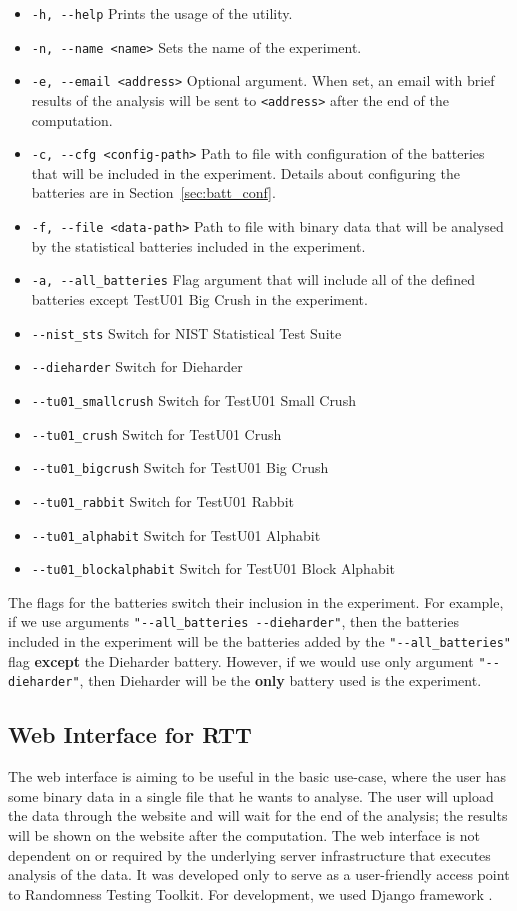 \documentclass[
	digital,    %
	oneside,    %
	color,
	11pt,
	nocover,
	notable,
	nolof,
	nolot,
]{fithesis3}
\theoremstyle{definition}
\theoremstyle{remark}
\begin{document}
\begin{itemize}
\item \texttt{-h, -{}-help} Prints the usage of the utility.
\item \texttt{-n, -{}-name <name>} Sets the name of the experiment.
\item \texttt{-e, -{}-email <address>} Optional argument. When set, an email with brief results of the analysis will be sent to \texttt{<address>} after the end of the computation.
\item \texttt{-c, -{}-cfg <config-path>} Path to file with configuration of the batteries that will be included in the experiment. Details about configuring the batteries are in Section~\ref{sec:batt_conf}.
\item \texttt{-f, -{}-file <data-path>} Path to file with binary data that will be analysed by the statistical batteries included in the experiment.
\item \texttt{-a, -{}-all\_batteries} Flag argument that will include all of the defined batteries except TestU01 Big Crush in the experiment.
\item \texttt{-{}-nist\_sts} Switch for NIST Statistical Test Suite
\item \texttt{-{}-dieharder} Switch for Dieharder 
\item \texttt{-{}-tu01\_smallcrush} Switch for TestU01 Small Crush
\item \texttt{-{}-tu01\_crush} Switch for TestU01 Crush
\item \texttt{-{}-tu01\_bigcrush} Switch for TestU01 Big Crush
\item \texttt{-{}-tu01\_rabbit} Switch for TestU01 Rabbit
\item \texttt{-{}-tu01\_alphabit} Switch for TestU01 Alphabit
\item \texttt{-{}-tu01\_blockalphabit} Switch for TestU01 Block Alphabit
\end{itemize}

The flags for the batteries switch their inclusion in the experiment. For example, if we use arguments \texttt{"-{}-all\_batteries -{}-dieharder"}, then the batteries included in the experiment will be the batteries added by the \texttt{"-{}-all\_batteries"} flag \textbf{except} the Dieharder battery. However, if we would use only argument \texttt{"-{}-dieharder"}, then Dieharder will be the \textbf{only} battery used is the experiment.

\subsection{Web Interface for RTT}
The web interface is aiming to be useful in the basic use-case, where the user has some binary data in a single file that he wants to analyse. The user will upload the data through the website and will wait for the end of the analysis; the results will be shown on the website after the computation. The web interface is not dependent on or required by the underlying server infrastructure that executes analysis of the data. It was developed only to serve as a user-friendly access point to Randomness Testing Toolkit. For development, we used Django framework \cite{django}.
\end{document}

